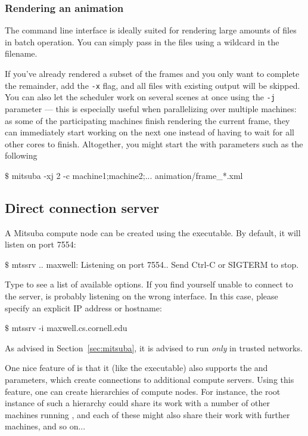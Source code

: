 \subsubsection{Rendering an animation}
The command line interface is ideally suited for rendering large amounts of files in batch
operation. You can simply pass in the files using a wildcard in the filename. 

If you've already rendered a subset of the frames and you only want to complete the remainder, 
add the \texttt{-x} flag, and all files with existing output will be skipped. You can also 
let the scheduler work on several scenes at once using the \texttt{-j} parameter --- this is 
especially useful when parallelizing over multiple machines: as some of the participating machines
finish rendering the current frame, they can immediately start working on the next one
instead of having to wait for all other cores to finish. Altogether, you
might start the with parameters such as the following
\begin{shell}
$\texttt{\$}$ mitsuba -xj 2 -c machine1;machine2;...  animation/frame_*.xml
\end{shell}
\subsection{Direct connection server}
\label{sec:mtssrv}
A Mitsuba compute node can be created using the  executable. By default,
it will listen on port 7554:
\begin{shell}
$\texttt{\$}$ mtssrv
..
maxwell: Listening on port 7554.. Send Ctrl-C or SIGTERM to stop.
\end{shell}
Type  to see a list of available options.
If you find yourself unable to connect to the server,  is probably listening on
the wrong interface. In this case, please specify an explicit IP address or hostname:
\begin{shell}
$\texttt{\$}$ mtssrv -i maxwell.cs.cornell.edu
\end{shell}
As advised in Section~\ref{sec:mitsuba}, it is advised to run  \emph{only} in trusted networks.

One nice feature of  is that it (like the  executable) 
also supports the  and  parameters, which create connections 
to additional compute servers.
Using this feature, one can create hierarchies of compute nodes. For instance,
the root  instance of such a hierarchy could share its work with a 
number of other  machines running , and each of these might also 
share their work with further machines, and so on...

